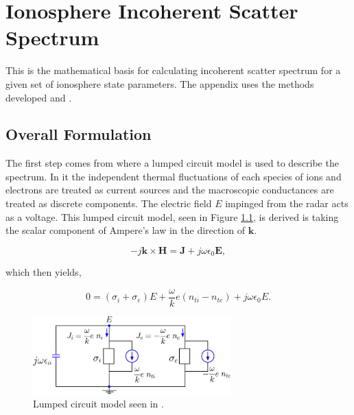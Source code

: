 \chapter{Ionosphere Incoherent Scatter Spectrum}
\label{appendix1}
\thispagestyle{myheadings}
\graphicspath{{Appendix/Figures/}}


This is the mathematical basis for calculating incoherent scatter spectrum for a given set of ionosphere state parameters. The appendix uses the methods developed \cite{kudeki:milla:1} and \cite{Kudeki:2006kx}.

\section*{Overall Formulation}
The first step comes from \cite{kudeki:milla:1} where a lumped circuit model is used to describe the spectrum. In it the independent thermal fluctuations of each species of ions and electrons are treated as current sources and the macroscopic conductances are treated as discrete components. The electric field $E$ impinged from the radar acts as a voltage. This lumped circuit model, seen in Figure \ref{fig:circuit}, is derived is taking the scalar component of Ampere's law in the direction of $\mathbf{k}$.  

\begin{equation}
\label{eq:ampere}
-j\mathbf{k} \times \mathbf{H} = \mathbf{J} +j\omega \epsilon_0 \mathbf{E},
\end{equation}

\noindent which then yields,

\begin{equation} 
\label{eq:ampscaler}
0=(\sigma_i +\sigma_e)E +\frac{\omega}{k}e(n_{ti}-n_{te}) +j\omega \epsilon_0 E.
\end{equation}

\begin{figure}[!h]
\centering
\includegraphics[width=3.0in]{circuit}
\caption{Lumped circuit model seen in  \cite{kudeki:milla:1}.}
\label{fig:circuit}
\end{figure}

